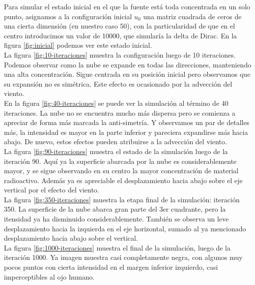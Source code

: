 \documentclass[twocolumn,a4paper,10pt]{article}
\begin{document}
Para simular el estado inicial en el que la fuente est\'a toda concentrada en un solo punto, asignamos a la configuraci\'on inicial $u_{0}$ una matriz 
cuadrada de ceros de una cierta dimensi\'on (en nuestro caso 50), con la particularidad de que en el centro introducimos un valor de 10000, que simular\'ia
la delta de Dirac. En la figura \ref{fig:inicial} podemos ver este estado inicial.\\

La figura \ref{fig:10-iteraciones} muestra la configuraci\'on luego de 10 iteraciones. Podemos observar como la nube se expande en todas las direcciones, 
manteniendo una alta concentraci\'on. Sigue centrada en su posici\'on inicial pero observamos que su expansi\'on no es sim\'etrica. Este efecto es ocasionado 
por la advecci\'on del viento. \\

En la figura \ref{fig:40-iteraciones} se puede ver la simulaci\'on al t\'ermino de 40 iteraciones. La nube no se encuentra mucho más dispersa pero se 
comienza a apreciar de forma m\'as marcada la anti-simetr\'ia. Y observamos un par de detalles m\'as, la intensidad es mayor en la parte inferior y pareciera
expandirse m\'as hacia abajo. De nuevo, estos efectos pueden atribuirse a la advecci\'on del viento.\\ 

La figura \ref{fig:90-iteraciones} muestra el estado de la simulaci\'on luego de la iteraci\'on 90. Aqu\'i ya la superficie abarcada por la nube es 
considerablemente mayor, y se sigue observando en su centro la mayor concentraci\'on de material radioactivo. Adem\'as ya es apreciable el desplazamiento hacia 
abajo sobre el eje vertical por el efecto del viento.\\

La figura \ref{fig:350-iteraciones} muestra la etapa final de la simulaci\'on: iteraci\'on 350. La superficie de la nube abarca gran parte del 3er cuadrante, 
pero la itensidad ya ha disminuido considerablemente. También se observa un leve desplazamiento hacia la izquierda en el eje horizontal, sumado al ya mencionado 
desplazamiento hacia abajo sobre el vertical. \\

La figura \ref{fig:1000-iteraciones} muestra el final de la simulaci\'on, luego de la iteraci\'on 1000. Ya imagen muestra casi completamente negra, con algunos muy 
pocos puntos con cierta intensidad en el margen inferior izquierdo, casi imperceptibles al ojo humano.
\end{document}
